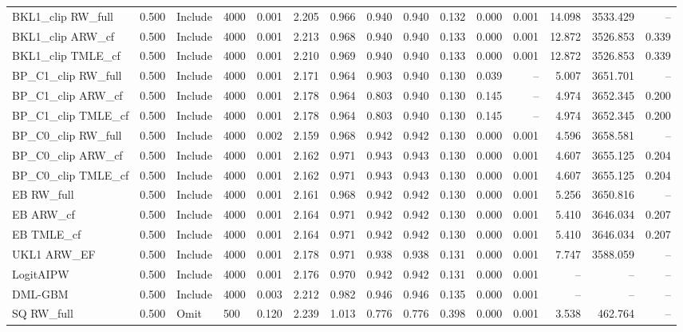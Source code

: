 \begin{tabular}{llllrrrrrrrrrrr}
BKL1\_clip RW\_full & 0.500 & Include & 4000 & 0.001 & 2.205 & 0.966 & 0.940 & 0.940 & 0.132 & 0.000 & 0.001 & 14.098 & 3533.429 & -- \\
BKL1\_clip ARW\_cf & 0.500 & Include & 4000 & 0.001 & 2.213 & 0.968 & 0.940 & 0.940 & 0.133 & 0.000 & 0.001 & 12.872 & 3526.853 & 0.339 \\
BKL1\_clip TMLE\_cf & 0.500 & Include & 4000 & 0.001 & 2.210 & 0.969 & 0.940 & 0.940 & 0.133 & 0.000 & 0.001 & 12.872 & 3526.853 & 0.339 \\
BP\_C1\_clip RW\_full & 0.500 & Include & 4000 & 0.001 & 2.171 & 0.964 & 0.903 & 0.940 & 0.130 & 0.039 & -- & 5.007 & 3651.701 & -- \\
BP\_C1\_clip ARW\_cf & 0.500 & Include & 4000 & 0.001 & 2.178 & 0.964 & 0.803 & 0.940 & 0.130 & 0.145 & -- & 4.974 & 3652.345 & 0.200 \\
BP\_C1\_clip TMLE\_cf & 0.500 & Include & 4000 & 0.001 & 2.178 & 0.964 & 0.803 & 0.940 & 0.130 & 0.145 & -- & 4.974 & 3652.345 & 0.200 \\
BP\_C0\_clip RW\_full & 0.500 & Include & 4000 & 0.002 & 2.159 & 0.968 & 0.942 & 0.942 & 0.130 & 0.000 & 0.001 & 4.596 & 3658.581 & -- \\
BP\_C0\_clip ARW\_cf & 0.500 & Include & 4000 & 0.001 & 2.162 & 0.971 & 0.943 & 0.943 & 0.130 & 0.000 & 0.001 & 4.607 & 3655.125 & 0.204 \\
BP\_C0\_clip TMLE\_cf & 0.500 & Include & 4000 & 0.001 & 2.162 & 0.971 & 0.943 & 0.943 & 0.130 & 0.000 & 0.001 & 4.607 & 3655.125 & 0.204 \\
EB RW\_full & 0.500 & Include & 4000 & 0.001 & 2.161 & 0.968 & 0.942 & 0.942 & 0.130 & 0.000 & 0.001 & 5.256 & 3650.816 & -- \\
EB ARW\_cf & 0.500 & Include & 4000 & 0.001 & 2.164 & 0.971 & 0.942 & 0.942 & 0.130 & 0.000 & 0.001 & 5.410 & 3646.034 & 0.207 \\
EB TMLE\_cf & 0.500 & Include & 4000 & 0.001 & 2.164 & 0.971 & 0.942 & 0.942 & 0.130 & 0.000 & 0.001 & 5.410 & 3646.034 & 0.207 \\
UKL1 ARW\_EF & 0.500 & Include & 4000 & 0.001 & 2.178 & 0.971 & 0.938 & 0.938 & 0.131 & 0.000 & 0.001 & 7.747 & 3588.059 & -- \\
LogitAIPW & 0.500 & Include & 4000 & 0.001 & 2.176 & 0.970 & 0.942 & 0.942 & 0.131 & 0.000 & 0.001 & -- & -- & -- \\
DML-GBM & 0.500 & Include & 4000 & 0.003 & 2.212 & 0.982 & 0.946 & 0.946 & 0.135 & 0.000 & 0.001 & -- & -- & -- \\
SQ RW\_full & 0.500 & Omit & 500 & 0.120 & 2.239 & 1.013 & 0.776 & 0.776 & 0.398 & 0.000 & 0.001 & 3.538 & 462.764 & -- \\

\end{tabular}
